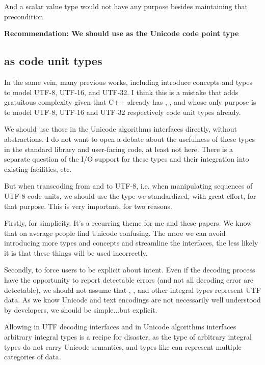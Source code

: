\documentclass{wg21}
\begin{document}
And a scalar value type would not have any purpose besides maintaining that precondition.

\textbf{Recommendation: We should use  as the Unicode code point type}

\subsection{ as code unit types}

In the same vein, many previous works, including  introduce concepts and types to model UTF-8, UTF-16, and UTF-32.
I think this is a mistake that adds gratuitous complexity given that C++ already has , , and  whose only purpose is to model UTF-8, UTF-16 and UTF-32 respectively code unit types already.

We should use those in the Unicode algorithms interfaces directly, without abstractions.
I do not want to open a debate about the usefulness of these types in the standard library and user-facing code, at least not here.
There is a separate question of the I/O support for these types and their integration into existing facilities, etc.

But when transcoding from and to UTF-8, i.e. when manipulating sequences of UTF-8 code units, we should use the type we standardized, with great effort, for that purpose.
This is very important, for two reasons.

Firstly, for simplicity. It's a recurring theme for me and these papers. We know that on average people find Unicode confusing. The more we can avoid introducing more types and concepts and streamline the interfaces, the less likely it is that these things will be used incorrectly.

Secondly, to force users to be explicit about intent. Even if the decoding process have the opportunity to report detectable errors (and not all decoding error are detectable), we should not assume that , ,  and other integral types represent UTF data. As we know Unicode and text encodings are not necessarily well understood by developers, we should be simple...but explicit.

Allowing in UTF decoding interfaces and in Unicode algorithms interfaces arbitrary integral types is a recipe for disaster, as the type of arbitrary integral types
do not carry Unicode semantics, and types like  can represent multiple categories of data.
\end{document}
